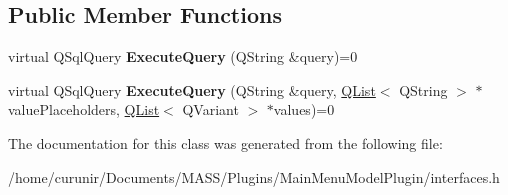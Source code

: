 \subsection*{Public Member Functions}
\begin{DoxyCompactItemize}
\item 
virtual Q\+Sql\+Query {\bfseries Execute\+Query} (Q\+String \&query)=0\hypertarget{class_i_data_base_source_plugin_a4ec8ebd5229431cf3b87548f258960b8}{}\label{class_i_data_base_source_plugin_a4ec8ebd5229431cf3b87548f258960b8}

\item 
virtual Q\+Sql\+Query {\bfseries Execute\+Query} (Q\+String \&query, \hyperlink{class_q_list}{Q\+List}$<$ Q\+String $>$ $\ast$value\+Placeholders, \hyperlink{class_q_list}{Q\+List}$<$ Q\+Variant $>$ $\ast$values)=0\hypertarget{class_i_data_base_source_plugin_a0f7fce934bf41f5f18c52951a7eb179c}{}\label{class_i_data_base_source_plugin_a0f7fce934bf41f5f18c52951a7eb179c}

\end{DoxyCompactItemize}


The documentation for this class was generated from the following file\+:\begin{DoxyCompactItemize}
\item 
/home/curunir/\+Documents/\+M\+A\+S\+S/\+Plugins/\+Main\+Menu\+Model\+Plugin/interfaces.\+h\end{DoxyCompactItemize}
